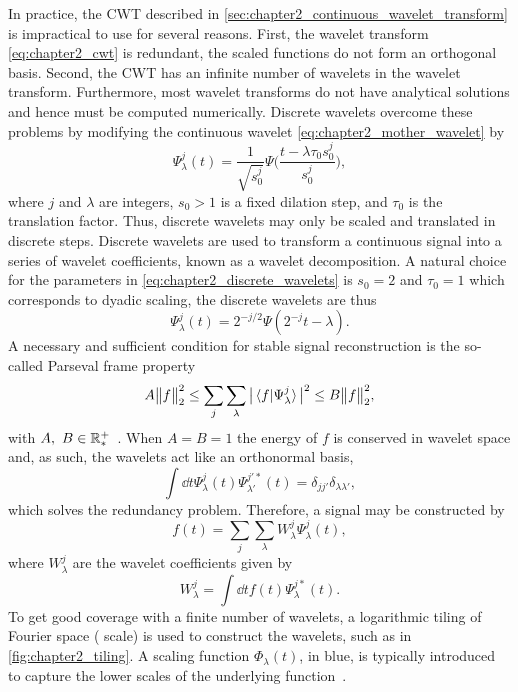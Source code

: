 In practice, the CWT described in \cref{sec:chapter2_continuous_wavelet_transform} is impractical to use for several reasons.
First, the wavelet transform \cref{eq:chapter2_cwt} is redundant, \ie{} the scaled functions do not form an orthogonal basis.
Second, the CWT has an infinite number of wavelets in the wavelet transform.
Furthermore, most wavelet transforms do not have analytical solutions and hence must be computed numerically.
Discrete wavelets overcome these problems by modifying the continuous wavelet \cref{eq:chapter2_mother_wavelet} by
%
\begin{equation}\label{eq:chapter2_discrete_wavelets}
    \Psi^{j}_{\lambda}(t)
    = \frac{1}{\sqrt{s^{j}_{0}}} \Psi\Bigg(\frac{t - \lambda\tau_{0}s^{j}_{0}}{s^{j}_{0}}\Bigg),
\end{equation}
%
where \(j\) and \(\lambda{}\) are integers, \(s_{0}>1\) is a fixed dilation step, and \(\tau_{0}\) is the translation factor.
Thus, discrete wavelets may only be scaled and translated in discrete steps.
Discrete wavelets are used to transform a continuous signal into a series of wavelet coefficients, known as a wavelet decomposition.
A natural choice for the parameters in \cref{eq:chapter2_discrete_wavelets} is \(s_{0}=2\) and \(\tau_{0}=1\) which corresponds to dyadic scaling, the discrete wavelets are thus
%
\begin{equation}
    \Psi^{j}_{\lambda}(t)
    = 2^{-j/2} \Psi(2^{-j}t - \lambda).
\end{equation}
%
A necessary and sufficient condition for stable signal reconstruction is the so-called Parseval frame property
%
\begin{equation}
    A {\big\lVert f\big\rVert}_{2}^{2}
    \leq \sum\limits_{j} \sum\limits_{\lambda} \big\lvert\braket*{f}{\Psi^{j}_{\lambda}}\big\rvert^{2}
    \leq B {\big\lVert f\big\rVert}_{2}^{2},
\end{equation}
%
with \(A,\ B \in \mathbb{R}_{\ast}^{+}{}\)~\cite{Daubechies1992}.
When \(A=B=1\) the energy of \(f\) is conserved in wavelet space and, as such, the wavelets act like an orthonormal basis, \ie{}
%
\begin{equation}
    \int\dd{t} \Psi^{j}_{\lambda}(t) \Psi^{j'\ast}_{\lambda'}(t)
    = \delta_{j j'} \delta_{\lambda\lambda'},
\end{equation}
%
which solves the redundancy problem.
Therefore, a signal may be constructed by~\cite{Sheng2010}
%
\begin{equation}
    f(t)
    = \sum\limits_{j} \sum\limits_{\lambda} W^{j}_{\lambda} \Psi^{j}_{\lambda}(t),
\end{equation}
%
where \(W^{j}_{\lambda}\) are the wavelet coefficients given by
%
\begin{equation}
    W^{j}_{\lambda}
    = \int\dd{t} f(t) \Psi^{j\ast}_{\lambda}(t).
\end{equation}
%
To get good coverage with a finite number of wavelets, a logarithmic tiling of Fourier space (\ie{} scale) is used to construct the wavelets, such as in \cref{fig:chapter2_tiling}.
A scaling function \(\Phi_{\lambda}(t)\), in blue, is typically introduced to capture the lower scales of the underlying function~\cite{Mallat1989}.

